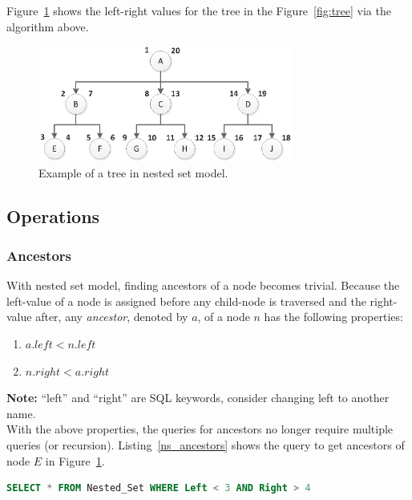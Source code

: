 Figure~\ref{fig:tree-lr} shows the left-right values for the tree in the Figure~\ref{fig:tree} via the algorithm above.

\begin{figure}[H]
\begin{center}
\includegraphics[width=3.3in]{images/tree-lr.eps}
\caption{Example of a tree in nested set model.\label{fig:tree-lr}}
\end{center}
\end{figure}

\subsection{Operations}

\subsubsection{Ancestors}

With nested set model, finding ancestors of a node becomes trivial. Because the left-value of a node is assigned before any child-node is traversed and the right-value after, any \emph{ancestor}, denoted by $a$, of a node $n$ has the following properties:

\begin{enumerate}
\item $a.left < n.left$
\item $n.right < a.right$
\end{enumerate}

\textbf{Note:} ``left'' and ``right'' are SQL keywords, consider changing left to another name.\\

With the above properties, the queries for ancestors no longer require multiple queries (or recursion). Listing~\ref{ns_ancestors} shows the query to get ancestors of node $E$ in Figure~\ref{fig:tree-lr}.

\begin{lstlisting}[language=sql,caption={Query for ancestors for node $E$ via nested set model},label=ns_ancestors]
SELECT * FROM Nested_Set WHERE Left < 3 AND Right > 4
\end{lstlisting}


